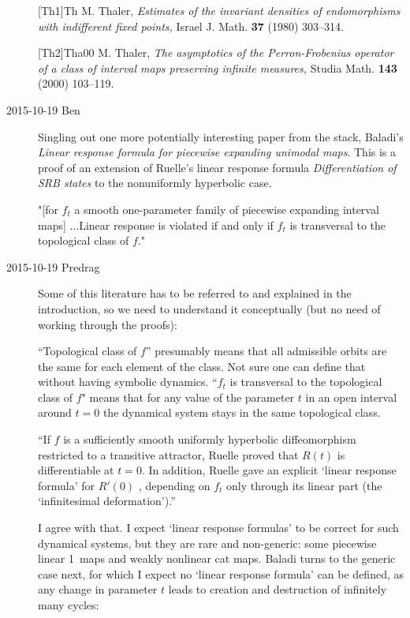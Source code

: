 \begin{description}



[Th1]{Th} M. Thaler, {\it Estimates of the invariant densities of
endomorphisms with indifferent fixed points,}
 Israel J. Math. \textbf{37} (1980) 303--314.

[Th2]{Tha00} M. Thaler,
\emph{The asymptotics of the {Perron-Frobenius} operator of a class of
interval maps preserving infinite measures,}
 Studia Math. \textbf{143} (2000) 103--119.

\item[2015-10-19 Ben] Singling out one more potentially interesting paper from the stack,
Baladi's {\em Linear response formula for piecewise expanding unimodal maps}.
This is a proof of an extension of Ruelle's linear response formula
{\em Differentiation of SRB states} to the nonuniformly hyperbolic case.

"[for $f_{t}$ a smooth one-parameter family of piecewise expanding
interval maps] ...Linear response is violated if and only if $f_{t}$ is
transversal to the topological class of $f$."

\item[2015-10-19 Predrag]
Some of this literature has to be referred to and explained in the
introduction, so we need to understand it conceptually (but no need of
working through the proofs):

``Topological class of $f$'' presumably means that all admissible orbits
are the same for each element of the class. Not sure one can define that
without having symbolic dynamics. ``$f_{t}$ is transversal to the
topological class of $f$" means that for any value of the parameter $t$
in an open interval around $t=0$ the dynamical system stays in the same
topological class.

``If $f$ is a sufficiently smooth uniformly hyperbolic diffeomorphism
restricted to a transitive attractor,
Ruelle proved that $R (t)$ is
differentiable at $t = 0$.  In addition, Ruelle gave an explicit `linear
response formula' for $R'( 0 )$ , depending on $f_t$ only through its
linear part (the `infinitesimal deformation').''

I agree with that. I expect `linear response formulas' to be correct for such dynamical
systems, but they are rare and non-generic: some piecewise linear 1\dmn\
maps and weakly nonlinear cat maps. Baladi turns to the generic case next,
for which I expect no `linear response formula' can be defined, as any
change in parameter $t$ leads to creation and destruction of infinitely
many cycles:


\end{description}
